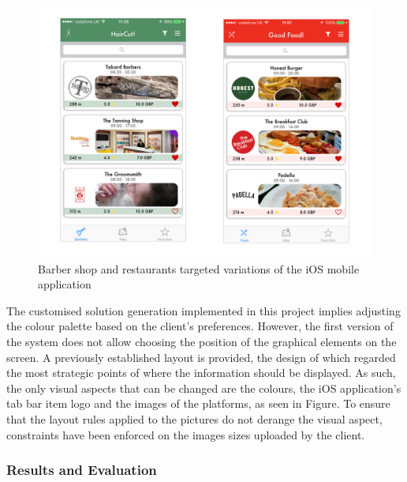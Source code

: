\begin{figure}[!ht]
\centering
\includegraphics[scale=0.15]{img/barbers-restaurants.png}
\caption{Barber shop and restaurants targeted variations of the iOS mobile application}
\label{fig:barbers_restaurants}
\end{figure}

The customised solution generation implemented in this project implies adjusting the colour palette based on the client's preferences. However, the first version of the system does not allow choosing the position of the graphical elements on the screen. A previously established layout is provided, the design of which regarded the most strategic points of where the information should be displayed. As such, the only visual aspects that can be changed are the colours, the iOS application's tab bar item logo and the images of the platforms, as seen in Figure. To ensure that the layout rules applied to the pictures do not derange the visual aspect, constraints have been enforced on the images sizes uploaded by the client.\\

\subsubsection{Results and Evaluation}

